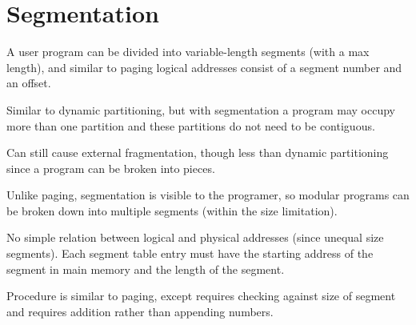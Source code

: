 \documentclass[11pt]{article}
\begin{document}
\section{Segmentation}
\label{sec:org22c2b76}
A user program can be divided into variable-length segments (with a max length), and
similar to paging logical addresses consist of a segment number and an offset.

Similar to dynamic partitioning, but with segmentation a program may occupy more than one
partition and these partitions do not need to be contiguous.

Can still cause external fragmentation, though less than dynamic partitioning since a
program can be broken into pieces.

Unlike paging, segmentation is visible to the programer, so modular programs can be
broken down into multiple segments (within the size limitation).

No simple relation between logical and physical addresses (since unequal size segments).
Each segment table entry must have the starting address of the segment in main memory
and the length of the segment.

Procedure is similar to paging, except requires checking against size of segment and
requires addition rather than appending numbers.
\end{document}

